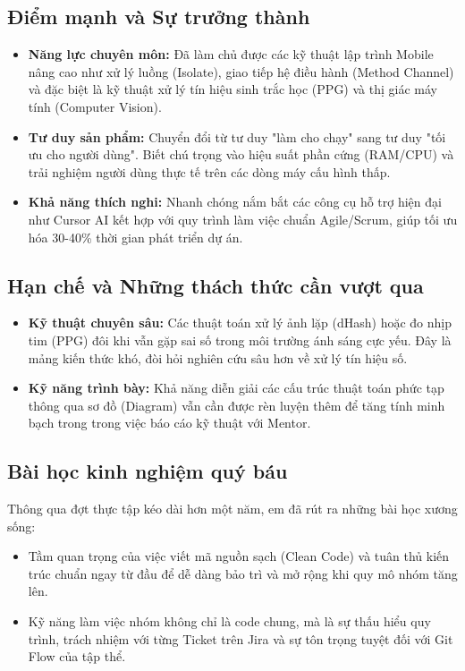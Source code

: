 \documentclass[12pt, a4paper]{article}
\begin{document}
\subsection{Điểm mạnh và Sự trưởng thành}
\begin{itemize}
    \item \textbf{Năng lực chuyên môn:} Đã làm chủ được các kỹ thuật lập trình Mobile nâng cao như xử lý luồng (Isolate), giao tiếp hệ điều hành (Method Channel) và đặc biệt là kỹ thuật xử lý tín hiệu sinh trắc học (PPG) và thị giác máy tính (Computer Vision).
    \item \textbf{Tư duy sản phẩm:} Chuyển đổi từ tư duy "làm cho chạy" sang tư duy "tối ưu cho người dùng". Biết chú trọng vào hiệu suất phần cứng (RAM/CPU) và trải nghiệm người dùng thực tế trên các dòng máy cấu hình thấp.
    \item \textbf{Khả năng thích nghi:} Nhanh chóng nắm bắt các công cụ hỗ trợ hiện đại như Cursor AI kết hợp với quy trình làm việc chuẩn Agile/Scrum, giúp tối ưu hóa 30-40\% thời gian phát triển dự án.
\end{itemize}

\subsection{Hạn chế và Những thách thức cần vượt qua}
\begin{itemize}
    \item \textbf{Kỹ thuật chuyên sâu:} Các thuật toán xử lý ảnh lặp (dHash) hoặc đo nhịp tim (PPG) đôi khi vẫn gặp sai số trong môi trường ánh sáng cực yếu. Đây là mảng kiến thức khó, đòi hỏi nghiên cứu sâu hơn về xử lý tín hiệu số.
    \item \textbf{Kỹ năng trình bày:} Khả năng diễn giải các cấu trúc thuật toán phức tạp thông qua sơ đồ (Diagram) vẫn cần được rèn luyện thêm để tăng tính minh bạch trong trong việc báo cáo kỹ thuật với Mentor.
\end{itemize}

\subsection{Bài học kinh nghiệm quý báu}
Thông qua đợt thực tập kéo dài hơn một năm, em đã rút ra những bài học xương sống:
\begin{itemize}
    \item Tầm quan trọng của việc viết mã nguồn sạch (Clean Code) và tuân thủ kiến trúc chuẩn ngay từ đầu để dễ dàng bảo trì và mở rộng khi quy mô nhóm tăng lên.
    \item Kỹ năng làm việc nhóm không chỉ là code chung, mà là sự thấu hiểu quy trình, trách nhiệm với từng Ticket trên Jira và sự tôn trọng tuyệt đối với Git Flow của tập thể.
\end{itemize}
\end{document}
